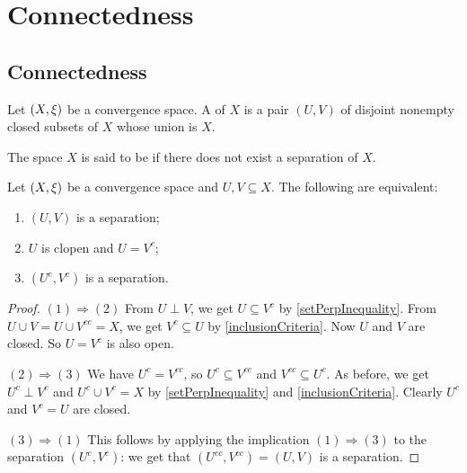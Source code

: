 \chapter{Connectedness}
\section{Connectedness}
\begin{definition}
Let $\left( X, \xi \right)$ be a convergence space. A  of $X$ is a pair $(U,V)$ of disjoint nonempty closed subsets of $X$ whose union is $X$.

The space $X$ is said to be  if there does not exist a separation of $X$.
\end{definition}

\begin{lemma} \label{disconnectionLemma}
Let $\left( X, \xi \right)$ be a convergence space and $U,V\subseteq X$. The following are equivalent:
\begin{enumerate}
\item $(U, V)$ is a separation;
\item $U$ is clopen and $U= V^c$;
\item $(U^c, V^c)$ is a separation.
\end{enumerate}
\end{lemma}
\begin{proof}
$(1) \Rightarrow (2)$ From $U\perp V$, we get $U\subseteq V^c$ by \ref{setPerpInequality}. From $U\cup V = U\cup V^{cc} = X$, we get $V^c \subseteq U$ by \ref{inclusionCriteria}. Now $U$ and $V$ are closed. So $U = V^c$ is also open.

$(2) \Rightarrow (3)$ We have $U^c = V^{cc}$, so $U^c \subseteq V^{cc}$ and $V^{cc}\subseteq U^c$. As before, we get $U^c\perp V^c$ and $U^c \cup V^c = X$ by \ref{setPerpInequality} and \ref{inclusionCriteria}. Clearly $U^c$ and $V^c = U$ are closed.

$(3) \Rightarrow (1)$ This follows by applying the implication $(1) \Rightarrow (3)$ to the separation $(U^c, V^c)$: we get that $(U^{cc}, V^{cc}) = (U,V)$ is a separation.
\end{proof}

